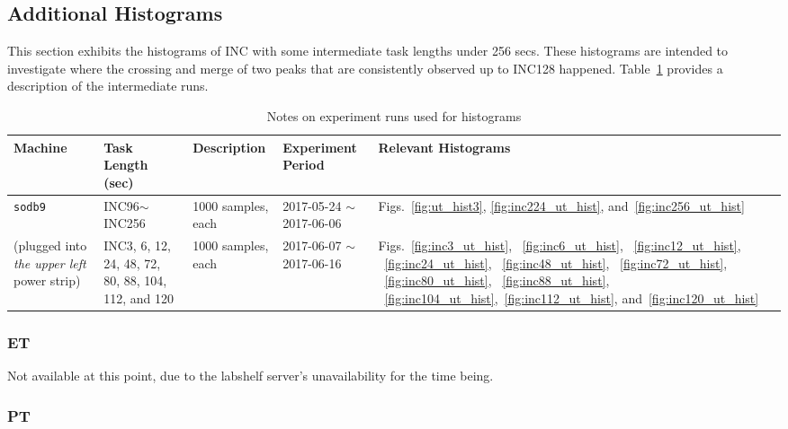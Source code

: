 \clearpage

\pagebreak
\newpage

\subsection{Additional Histograms}
This section exhibits the histograms of INC with some intermediate task lengths under 256 secs. 
These histograms are intended to investigate where the crossing and merge of two peaks that are consistently observed up to INC128 
happened. Table~\ref{tab:exp_notes4} provides a description of the intermediate runs. 
\begin{table}[h]
\begin{center}
\begin{tabular}{|p{2cm}|p{3cm}|p{3cm}|p{4cm}|p{3.5cm}|} \hline
Machine & Task Length (sec) & Description & Experiment Period & Relevant \linebreak Histograms\\ \hline
{\tt sodb9} &  INC96$\sim$INC256 & 1000 samples, each & 2017-05-24 $\sim$ 2017-06-06 & Figs.~\ref{fig:ut_hist3}, \ref{fig:inc224_ut_hist}, and~\ref{fig:inc256_ut_hist}\\ \cline{2-4}
(plugged into {\em the upper left} power strip)	&  INC3, 6, 12, 24, 48, 72, 80, 88, 104, 112, and 120 & 1000 samples, each & 2017-06-07 $\sim$ 2017-06-16 & Figs.~\ref{fig:inc3_ut_hist}, ~\ref{fig:inc6_ut_hist}, ~\ref{fig:inc12_ut_hist}, ~\ref{fig:inc24_ut_hist},
~\ref{fig:inc48_ut_hist}, ~\ref{fig:inc72_ut_hist}, ~\ref{fig:inc80_ut_hist}, ~\ref{fig:inc88_ut_hist}, ~\ref{fig:inc104_ut_hist},~\ref{fig:inc112_ut_hist}, and~\ref{fig:inc120_ut_hist}\\ \hline
\end{tabular}
\end{center}
\vspace{-.2in}
\caption{Notes on experiment runs used for histograms\label{tab:exp_notes4}}
\end{table}

\subsubsection{ET}
Not available at this point, due to the labshelf server's unavailability for the time being.

\pagebreak

\subsubsection{PT}


